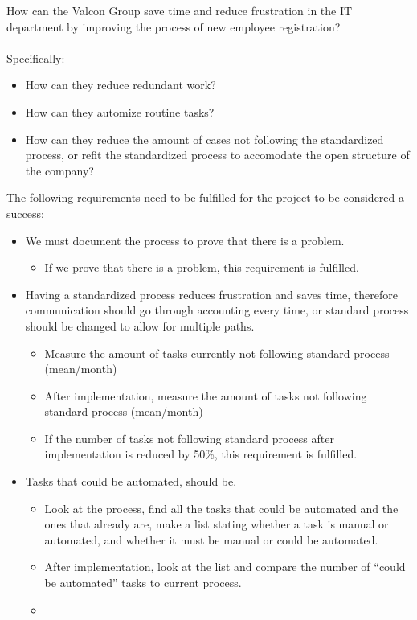 How can the Valcon Group save time and reduce frustration in the IT department by improving the process of new employee registration?
\\\\
Specifically:
\begin{itemize}
\item How can they reduce redundant work?
\item How can they automize routine tasks?
\item How can they reduce the amount of cases not following the standardized process, or refit the standardized process to accomodate the open structure of the company?
\end{itemize}

The following requirements need to be fulfilled for the project to be considered a success:
\begin{itemize}
\item
We must document the process to prove that there is a problem.
\begin{itemize}
\item If we prove that there is a problem, this requirement is fulfilled.
\end{itemize} 
\item
Having a standardized process reduces frustration and saves time, therefore communication should go through accounting every time, or standard process should be changed to allow for multiple paths.
\begin{itemize}
\item
Measure the amount of tasks currently not following standard process (mean/month)
\item
After implementation, measure the amount of tasks not following standard process (mean/month)
\item
If the number of tasks not following standard process after implementation is reduced by 50\%, this requirement is fulfilled.
\end{itemize}
\item
Tasks that could be automated, should be.
\begin{itemize}
\item
Look at the process, find all the tasks that could be automated and the ones that already are, make a list stating whether a task is manual or automated, and whether it must be manual or could be automated.
\item
After implementation, look at the list and compare the number of “could be automated” tasks to current process.
\item

\end{itemize}
\end{itemize}

